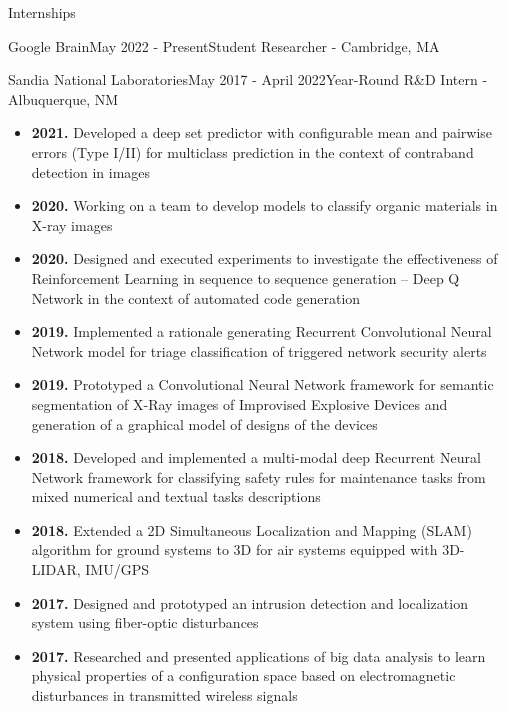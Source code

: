 \documentclass{resume} %
\begin{document}
\begin{rSection}{Internships}
\begin{rSubsection}{Google Brain}{May 2022 - Present}{Student Researcher - Cambridge, MA}

\end{rSubsection}

\begin{rSubsection}{Sandia National Laboratories}{May 2017 - April 2022}{Year-Round R\&D Intern - Albuquerque, NM}

\begin{itemize}[label={}]
    \setlength\itemsep{0em}
    \item \textbf{2021.} Developed a deep set predictor with configurable mean and pairwise errors (Type I/II) for multiclass prediction in the context of contraband detection in images
    \item \textbf{2020.} Working on a team to develop models to classify organic materials in X-ray images
    \item \textbf{2020.} Designed and executed experiments to investigate the effectiveness of Reinforcement Learning in sequence to sequence generation -- Deep Q Network in the context of automated code generation
    \item \textbf{2019.} Implemented a rationale generating Recurrent Convolutional Neural Network model for triage classification of triggered network security alerts
    \item \textbf{2019.} Prototyped a Convolutional Neural Network framework for semantic segmentation of X-Ray images of Improvised Explosive Devices and generation of a graphical model of designs of the devices
    \item \textbf{2018.} Developed and implemented a multi-modal deep Recurrent Neural Network framework for classifying safety rules for maintenance tasks from mixed numerical and textual tasks descriptions
    \item \textbf{2018.} Extended a 2D Simultaneous Localization and Mapping (SLAM) algorithm for ground systems to 3D for air systems equipped with 3D-LIDAR, IMU/GPS
    \item \textbf{2017.} Designed and prototyped an intrusion detection and localization system using fiber-optic disturbances 
    \item \textbf{2017.} Researched and presented applications of big data analysis to learn physical properties of a configuration space based on electromagnetic disturbances in transmitted wireless signals
\end{itemize}

\end{rSubsection}
\end{rSection}
\end{document}
